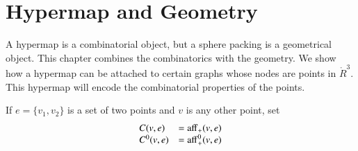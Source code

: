 

\chapter{Hypermap and Geometry}

A hypermap is a combinatorial object, but a sphere packing
is a geometrical object.  This chapter combines the combinatorics
with the geometry.
We show how a hypermap can be attached to certain
graphs whose nodes are points in $\ring{R}^3$. This hypermap will
encode the combinatorial properties of the points.



If $e=\{v_1,v_2\}$ is a set of two points and $v$ is any other point,
set
  $$
  \begin{array}{lll}
  C(v,e) &= {\operatorname{aff}}_+(v,e)\\
  C^0(v,e) &= {\operatorname{aff}}^0_+(v,e)\\
  \end{array}
  $$


